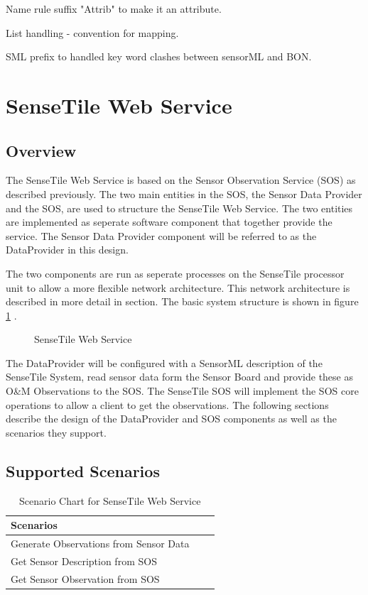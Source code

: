 \documentclass[]{final_report}
\begin{document}
Name rule suffix "Attrib" to make it an attribute.

List handling - convention for mapping.

SML prefix to handled key word clashes between sensorML and BON.


\section{SenseTile Web Service}
\subsection{Overview}

The SenseTile Web Service is based on the Sensor Observation Service (SOS) as described previously. The two main entities in the SOS, the Sensor Data Provider and the SOS,  are used to structure the SenseTile Web Service. The two entities are implemented as seperate software component that together provide the service. The Sensor Data Provider component will be referred to as the DataProvider in this design.

The two components are run as seperate processes on the SenseTile processor unit to allow a more flexible network architecture.  This network architecture is described in more detail in section. The basic system structure is shown in figure \ref {fig:Deployment_sensetile} .

\begin{figure}[h]
\caption{SenseTile Web Service}\label{fig:Deployment_sensetile}
\end{figure}

The DataProvider will be configured with a SensorML description of the SenseTile System, read sensor data form the Sensor Board and provide these as O\&M Observations to the SOS. The SenseTile SOS will implement the SOS core operations to allow a client to get the observations. The following sections describe the design of the DataProvider and SOS components as well as the scenarios they support.

\subsection{Supported Scenarios}
\begin{table}[!th]
\begin{tabular}{|l|c|r|}
\hline
Scenarios\\
\hline
Generate Observations from Sensor Data \\
\hline
Get Sensor Description from SOS\\
\hline
Get  Sensor Observation from SOS\\
\hline
\end{tabular}
\caption{Scenario Chart for SenseTile Web Service}
\label{ex:table}
\end{table}
\end{document}
